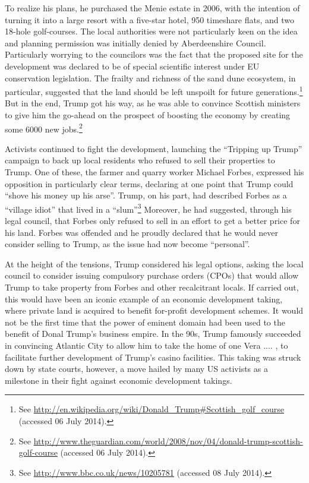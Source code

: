 To realize his plans, he purchased the Menie estate in 2006, with the intention of turning it into a large resort with a five-star hotel, 950 timeshare flats, and two 18-hole golf-courses. The local authorities were not particularly keen on the idea and planning permission was initially denied by Aberdeenshire Council. Particularly worrying to the councilors was the fact that the proposed site for the development was declared to be of special scientific interest under EU conservation legislation. The frailty and richness of the sand dune ecosystem, in particular, suggested that the land should be left unspoilt for future generations.\footnote{See \url{http://en.wikipedia.org/wiki/Donald_Trump#Scottish_golf_course} (accessed 06 July 2014).} But in the end, Trump got his way, as he was able to convince Scottish ministers to give him the go-ahead on the prospect of boosting the economy by creating some 6000 new jobs.\footnote{See \url{http://www.theguardian.com/world/2008/nov/04/donald-trump-scottish-golf-course} (accessed 06 July 2014).}

Activists continued to fight the development, launching the ``Tripping up Trump'' campaign to back up local residents who refused to sell their properties to Trump. One of these, the farmer and quarry worker Michael Forbes, expressed his opposition in particularly clear terms, declaring at one point that Trump could ``shove his money up his arse''. Trump, on his part, had described Forbes as a ``village idiot'' that lived in a ``slum''\footnote{See \url{http://www.bbc.co.uk/news/10205781} (accessed 08 July 2014).} Moreover, he had suggested, through his legal council, that Forbes only refused to sell in an effort to get a better price for his land.  Forbes was offended and he proudly declared that he would never consider selling to Trump, as the issue had now become ``personal''.

At the height of the tensions, Trump considered his legal options, asking the local council to consider issuing compulsory purchase orders (CPOs) that would allow Trump to take property from Forbes and other recalcitrant locals. If carried out, this would have been an iconic example of an economic development taking, where private land is acquired to benefit for-profit development schemes. It would not be the first time that the power of eminent domain had been used to the benefit of Donal Trump's business empire. In the 90s, Trump famously succeeded in convincing Atlantic City to allow him to take the home of one Vera .... , to facilitate further development of Trump's casino facilities. This taking was struck down by state courts, however, a move hailed by many US activists as a milestone in their fight against economic development takings. 

